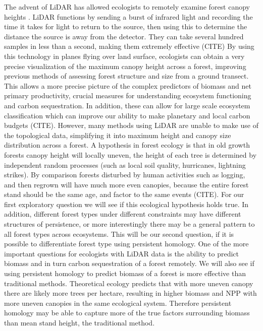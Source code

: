 \documentclass[11pt]{article}
\begin{document}
The advent of LiDAR has allowed ecologists to remotely examine forest canopy heights . LiDAR functions by sending a burst of infrared light and recording the time it takes for light to return to the source, then using this to determine the distance the source is away from the detector. They can take several hundred samples in less than a second, making them extremely effective (CITE) By using this technology in planes flying over land surface, ecologists can obtain a very precise visualization of the maximum canopy height across a forest, improving previous methods of assessing forest structure and size from a ground transect. This allows a more precise picture of the complex predictors of biomass and net primary productivity, crucial measures for understanding ecosystem functioning and carbon sequestration. In addition, these can allow for large scale ecosystem classification which can improve our ability to make planetary and local carbon budgets (CITE). However, many methods using LiDAR are unable to make use of the topological data, simplifying it into maximum height and canopy size distribution across a forest. A hypothesis in forest ecology is that in old growth forests canopy height will locally uneven, the height of each tree is determined by independent random processes (such as local soil quality, hurricanes, lightning strikes). By comparison forests disturbed by human activities such as logging, and then regrown will have much more even canopies, because the entire forest stand should be the same age, and factor to the same events (CITE). For our first exploratory question we will see if this ecological  hypothesis holds true. In addition, different forest types under different constraints may have different structures of persistence, or more interestingly there may be a general pattern to all forest types across ecosystems. This will be our second question, if it is possible to differentiate forest type using persistent homology. One of the more important questions for ecologists with LiDAR data is the ability to predict biomass and in turn carbon sequestration of a forest remotely. We will also see if using persistent homology to predict biomass of a forest is more effective than traditional methods. Theoretical ecology predicts that with more uneven canopy there are likely more trees per hectare, resulting in higher biomass and NPP with more uneven canopies in the same ecological system. Therefore persistent homology may be able to capture more of the true factors surrounding biomass than mean stand height, the traditional method.
\end{document}
